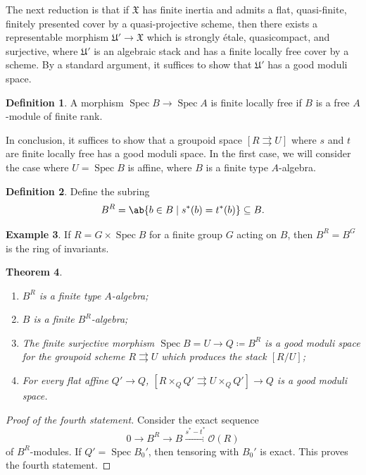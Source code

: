 \documentclass{amsart}
\newtheorem{thm}{Theorem}[section]
\theoremstyle{definition}
\newtheorem{defn}[thm]{Definition}
\newtheorem{exm}[thm]{Example}
\theoremstyle{remark}
\theoremstyle{plain}
\theoremstyle{definition}
\theoremstyle{remark}
\newcommand{\mc}[1]{\mathcal{#1}}
\newcommand{\mf}[1]{\mathfrak{#1}}
\newcommand{\1}{\mathbf{1}}
\newcommand{\2}{\mathbf{2}}
\newcommand{\3}{\mathbf{3}}
\DeclareMathOperator{\Spec}{Spec}
\begin{document}
The next reduction is that if \(\mf{X}\) has finite inertia and admits a flat, quasi-finite, finitely presented cover by a quasi-projective scheme, then there exists a representable morphism \(\mf{U}' \to \mf{X}\) which is strongly \'etale, quasicompact, and surjective, where \(\mf{U}'\) is an algebraic stack and has a finite locally free cover by a scheme. By a standard argument, it suffices to show that \(\mf{U}'\) has a good moduli space.

\begin{defn}
    A morphism \(\Spec B \to \Spec A\) is finite locally free if \(B\) is a free \(A\)-module of finite rank.
\end{defn}

In conclusion, it suffices to show that a groupoid space \([R \rightrightarrows U]\) where \(s\) and \(t\) are finite locally free has a good moduli space. In the first case, we will consider the case where \(U = \Spec B\) is affine, where \(B\) is a finite type \(A\)-algebra.

\begin{defn}
    Define the subring
    \[ B^R = \ab\{ b \in B \mid s^*(b) = t^*(b) \} \subseteq B. \]
\end{defn}

\begin{exm}
    If \(R = G \times \Spec B\) for a finite group \(G\) acting on \(B\), then \(B^R = B^G\) is the ring of invariants.
\end{exm}

\begin{thm}\leavevmode
    \begin{enumerate}
        \item \(B^R\) is a finite type \(A\)-algebra;
        \item \(B\) is a finite \(B^R\)-algebra;
        \item The finite surjective morphism \(\Spec B = U \to Q \coloneqq B^R\) is a good moduli space for the groupoid scheme \(R \rightrightarrows U\) which produces the stack \([R/U]\);
        \item For every flat affine \(Q' \to Q\), \([R \times_Q Q' \rightrightarrows U \times_Q Q'] \to Q\) is a good moduli space.
    \end{enumerate}
\end{thm}

\begin{proof}[Proof of the fourth statement]
    Consider the exact sequence
    \[ 0 \to B^R \to B \xrightarrow{s^* - t^*} \mc{O}(R) \]
    of \(B^R\)-modules. If \(Q' = \Spec B_0'\), then tensoring with \(B_0'\) is exact. This proves the fourth statement.
\end{proof}
\end{document}

